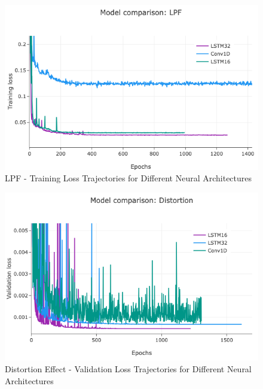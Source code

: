 \documentclass{article}
\begin{document}
\begin{sloppy}
\begin{figure}[t]
  \centering
  \centerline{\includegraphics[width=\columnwidth]{./plots/trimmedImgs/lpf trainLoss.png}}
  \caption{LPF - Training Loss Trajectories for Different Neural Architectures}
  \label{fig:lpfTrain}
\end{figure}

\begin{figure}[t]
  \centering
  \centerline{\includegraphics[width=\columnwidth]{./plots/trimmedImgs/dist valLoss.png}}
  \caption{Distortion Effect - Validation Loss Trajectories for Different Neural Architectures}
  \label{fig:distVal}
\end{figure}


\end{sloppy}
\end{document}
